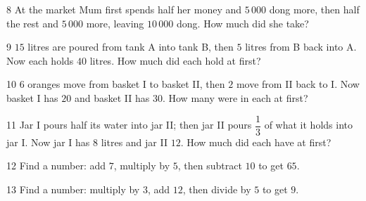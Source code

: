 \gap
\begin{probbox}{8}{\relax}
At the market Mum first spends half her money and $5\,000$ dong more, then half the rest and $5\,000$ more, leaving $10\,000$ dong. How much did she take?
\end{probbox}
\gap
\begin{probbox}{9}{\relax}
$15$ litres are poured from tank A into tank B, then $5$ litres from B back into A. Now each holds $40$ litres. How much did each hold at first?
\end{probbox}
\gap
\begin{probbox}{10}{\relax}
$6$ oranges move from basket I to basket II, then $2$ move from II back to I. Now basket I has $20$ and basket II has $30$. How many were in each at first?
\end{probbox}
\gap
\begin{probbox}{11}{\relax}
Jar I pours half its water into jar II; then jar II pours $\dfrac13$ of what it holds into jar I. Now jar I has $8$ litres and jar II $12$. How much did each have at first?
\end{probbox}
\gap
\begin{probbox}{12}{\relax}
Find a number: add $7$, multiply by $5$, then subtract $10$ to get $65$.
\end{probbox}
\gap
\begin{probbox}{13}{\relax}
Find a number: multiply by $3$, add $12$, then divide by $5$ to get $9$.
\end{probbox}
